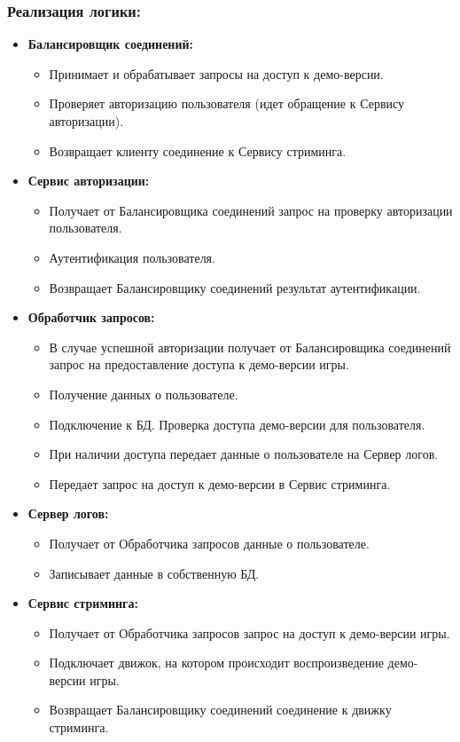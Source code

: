 \documentclass[12pt, a4paper]{article}
\begin{document}
\subsubsection*{Реализация логики:}
\begin{itemize}
    \item \textbf{Балансировщик соединений:}
    \begin{itemize}
        \item Принимает и обрабатывает запросы на доступ к демо-версии.
        \item Проверяет авторизацию пользователя (идет обращение к Сервису авторизации).
        \item Возвращает клиенту соединение к Сервису стриминга.
    \end{itemize}
    \item \textbf{Сервис авторизации:}
    \begin{itemize}
        \item Получает от Балансировщика соединений запрос на проверку авторизации пользователя.
        \item Аутентификация пользователя.
        \item Возвращает Балансировщику соединений результат аутентификации.
    \end{itemize}
    \item \textbf{Обработчик запросов:}
    \begin{itemize}
        \item В случае успешной авторизации получает от Балансировщика соединений запрос на предоставление доступа к демо-версии игры.
        \item Получение данных о пользователе.
        \item Подключение к БД. Проверка доступа демо-версии для пользователя.
        \item При наличии доступа передает данные о пользователе на Сервер логов.
        \item Передает запрос на доступ к демо-версии в Сервис стриминга.
    \end{itemize}
    \item \textbf{Сервер логов:}
    \begin{itemize}
        \item Получает от Обработчика запросов данные о пользователе.
        \item Записывает данные в собственную БД.
    \end{itemize}
    \item \textbf{Сервис стриминга:}
    \begin{itemize}
        \item Получает от Обработчика запросов запрос на доступ к демо-версии игры.
        \item Подключает движок, на котором происходит воспроизведение демо-версии игры.
        \item Возвращает Балансировщику соединений соединение к движку стриминга.
    \end{itemize}
\end{itemize}
\end{document}
